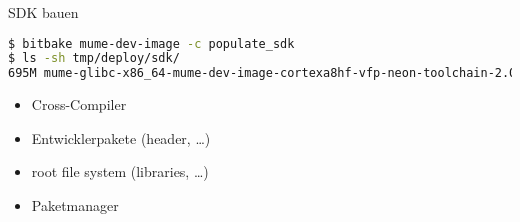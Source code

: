 \begin{frame}[fragile]{SDK bauen}
	\begin{lstlisting}[frame=single,language=bash, breaklines=true]
$ bitbake mume-dev-image -c populate_sdk
$ ls -sh tmp/deploy/sdk/
695M mume-glibc-x86_64-mume-dev-image-cortexa8hf-vfp-neon-toolchain-2.0.sh
	\end{lstlisting}
	\begin{itemize}
		\item Cross-Compiler
		\item Entwicklerpakete (header, \ldots)
		\item root file system (libraries, \ldots)
		\item Paketmanager
	\end{itemize}
\end{frame}
